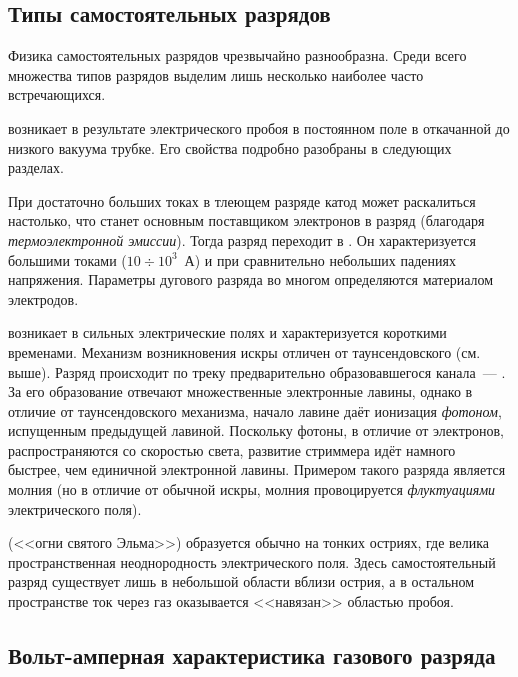\begin{labsupplement}


\subsection*{Типы самостоятельных разрядов}

Физика самостоятельных разрядов чрезвычайно разнообразна. Среди всего
множества типов разрядов выделим лишь несколько наиболее часто встречающихся.

 возникает в результате электрического пробоя в
постоянном поле в откачанной до низкого вакуума трубке. Его свойства
подробно разобраны в следующих разделах.

При достаточно больших токах в тлеющем разряде катод может раскалиться
настолько, что станет основным поставщиком электронов в разряд
(благодаря \emph{термоэлектронной эмиссии}). Тогда разряд
переходит в . Он характеризуется большими
токами ($10\div 10^3$~А) и при сравнительно небольших падениях
напряжения. Параметры дугового разряда во многом определяются материалом
электродов.


 возникает в сильных электрические полях
и характеризуется короткими временами. 
Механизм возникновения искры отличен от таунсендовского (см. выше).
Разряд происходит по треку предварительно образовавшегося канала~--- 
. За его образование отвечают множественные электронные лавины,
однако в отличие от таунсендовского механизма, начало лавине даёт ионизация
\emph{фотоном}, испущенным предыдущей лавиной. Поскольку фотоны, в отличие
от электронов, распространяются со скоростью света, развитие стриммера идёт
намного быстрее, чем единичной электронной лавины. 
Примером такого разряда является молния (но в отличие от обычной
искры, молния провоцируется \emph{флуктуациями} электрического поля).



 (<<огни святого Эльма>>)
образуется обычно на тонких остриях, где велика пространственная
неоднородность электрического поля. Здесь самостоятельный разряд
существует лишь в небольшой области вблизи острия, а в остальном
пространстве ток через газ оказывается <<навязан>> областью пробоя.



\subsection*{Вольт-амперная характеристика газового разряда}


\end{labsupplement}
